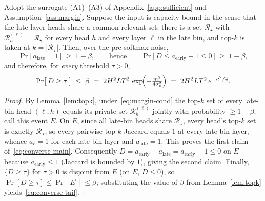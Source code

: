 \begin{theorem}
\label{thm:converse}
Adopt the surrogate (A1)--(A3) of Appendix~\ref{app:sufficient} and
Assumption~\ref{ass:margin}. Suppose the input is capacity-bound in the sense
that the late-layer heads share a common relevant set: there is a set
$\mathcal{R}_\star$ with $\mathcal{R}^{(\ell)}_h=\mathcal{R}_\star$ for every
head $h$ and every layer $\ell$ in the late bin, and top-$k$ is taken at
$k=|\mathcal{R}_\star|$. Then, over the pre-softmax noise,
\begin{equation}
\label{eq:converse-main}
\Pr\bigl[\,a_{\mathrm{late}} = 1\,\bigr]\;\ge\;1-\beta,
\qquad\text{hence}\qquad
\Pr\bigl[\,D \le a_{\mathrm{early}}-1 \le 0\,\bigr]\;\ge\;1-\beta,
\end{equation}
and therefore, for \emph{every} threshold $\tau>0$,
\begin{equation}
\label{eq:converse-tail}
\Pr\bigl[\,D \ge \tau\,\bigr]\;\le\;\beta
\;=\;2 H^2 L T^2\,\exp\!\Bigl(-\tfrac{m^2}{4\sigma_z^2}\Bigr)
\;=\;2 H^2 L T^2\,e^{-\kappa^2/4}.
\end{equation}
\end{theorem}

\begin{proof}
By Lemma~\ref{lem:topk}, under~\eqref{eq:margin-cond} the top-$k$ set of every
late-bin head $(\ell,h)$ equals its private set $\mathcal{R}^{(\ell)}_h$
jointly with probability $\ge1-\beta$; call this event $E$. On $E$, since all
late-bin heads share $\mathcal{R}_\star$, every head's top-$k$ set is exactly
$\mathcal{R}_\star$, so every pairwise top-$k$ Jaccard equals $1$ at every
late-bin layer, whence $a_\ell=1$ for each late-bin layer and
$a_{\mathrm{late}}=1$. This proves the first claim of~\eqref{eq:converse-main}.
Consequently $D=a_{\mathrm{early}}-a_{\mathrm{late}}=a_{\mathrm{early}}-1\le0$
on $E$ because $a_{\mathrm{early}}\le1$ (Jaccard is bounded by $1$), giving the
second claim. Finally, $\{D\ge\tau\}$ for $\tau>0$ is disjoint from $E$ (on $E$,
$D\le0$), so $\Pr[D\ge\tau]\le\Pr[E^{\mathrm c}]\le\beta$; substituting the
value of $\beta$ from Lemma~\ref{lem:topk} yields~\eqref{eq:converse-tail}.
\end{proof}

